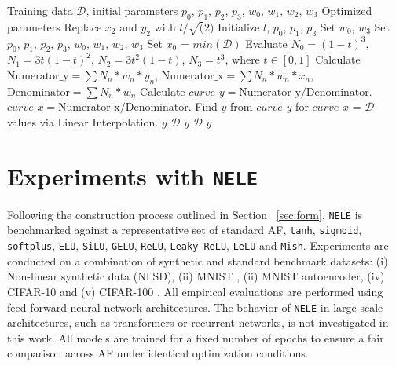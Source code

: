 \documentclass[manuscript, screen, review]{jair}
\begin{document}
\begin{algorithm}
\caption{NELE activation function}
\label{alg:nele_training}
\begin{algorithmic}[1]
\REQUIRE Training data $\mathcal{D}$, initial parameters $p_0$, $p_1$, $p_2$, $p_3$, $w_0$, $w_1$, $w_2$, $w_3$
\ENSURE Optimized parameters
    \STATE Replace $x_2$ and $y_2$ with $l/ \sqrt(2)$
    \STATE Initialize $l$, $p_0$, $p_1$, $p_3$
    \STATE Set $w_0$, $w_3$
\ELSE
    \STATE Set $p_0$, $p_1$, $p_2$, $p_3$, $w_0$, $w_1$, $w_2$, $w_3$
\ENDIF
{}
      \STATE Set $x_0$ = $min(\mathcal{D})$
    \ENDIF
    \STATE Evaluate $N_0 = (1-t)^3$, $N_1 = 3t(1-t)^2$, $N_2 = 3t^2(1-t)$, $N_3=t^3$, where $t \in [0,1]$
    \STATE Calculate $\text{Numerator\_y} = \sum N_n * w_n * y_n$, $\text{Numerator\_x} = \sum N_n * w_n * x_n$, $\text{Denominator} = \sum N_n * w_n$
    \STATE Calculate ${curve\_y} = \text{Numerator\_y}/\text{Denominator}$. ${curve\_x} = \text{Numerator\_x}/\text{Denominator}$.
    \STATE Find ${y}$ from ${curve\_y}$ for ${curve\_x}$ = $\mathcal{D}$ values via Linear Interpolation.
        \RETURN $y$ 
        \ELSE
        \RETURN $\mathcal{D}$
        \ENDIF
        \ELSE
        \RETURN $y$ 
        \ELSE
        \RETURN $\mathcal{D}$
        \ENDIF
      \ENDIF
    \ELSE
      \RETURN $y$
    \ENDIF
\ENDFOR
\end{algorithmic}
\end{algorithm}

\section{Experiments with \texttt{NELE}}
Following the construction process outlined in Section ~\ref{sec:form}, 
\texttt{NELE} is benchmarked against a representative set 
of standard AF, \texttt{tanh}, \texttt{sigmoid}, \texttt{softplus}, 
\texttt{ELU}, \texttt{SiLU}, \texttt{GELU}, \texttt{ReLU}, 
\texttt{Leaky ReLU}, \texttt{LeLU} \cite{BIGARELLA2026122739} and 
\texttt{Mish}. Experiments are conducted on a combination of synthetic and standard benchmark datasets: 
(i)  Non-linear synthetic data (NLSD), (ii) MNIST \cite{lecun1998mnist}, (ii) MNIST autoencoder, (iv) CIFAR-10 \cite{hope2017learning}
 and (v) CIFAR-100 \cite{krizhevsky2009cifar}. 
All empirical evaluations are performed using feed-forward neural 
network architectures. The behavior of \texttt{NELE} in 
large-scale architectures, such as transformers or 
recurrent networks, is not investigated in this work.
All models are trained for a fixed number of epochs to ensure a 
fair comparison across AF under identical optimization conditions.
\end{document}
